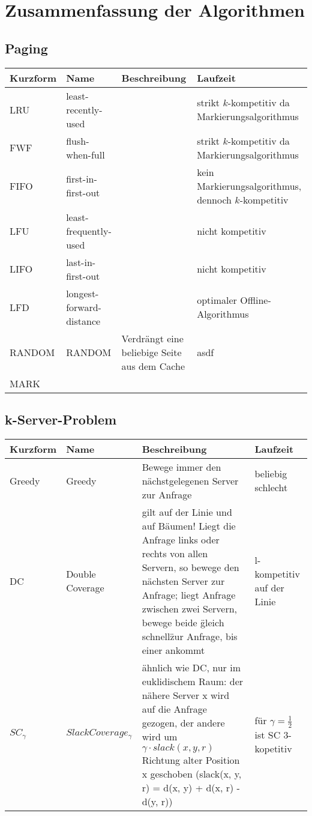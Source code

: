 \chapter{Zusammenfassung der Algorithmen}

\section{Paging}
\begin{tabularx}{\textwidth}{|l|X|X|X|} \hline
Kurzform & Name & Beschreibung & Laufzeit\\ \hline \hline
LRU  & least-recently-used      & & strikt $k$-kompetitiv da Markierungsalgorithmus \\ \hline
FWF  & flush-when-full          & & strikt $k$-kompetitiv da Markierungsalgorithmus \\ \hline
FIFO & first-in-first-out       & & kein Markierungsalgorithmus, dennoch $k$-kompetitiv \\ \hline
LFU  & least-frequently-used    & & nicht kompetitiv\\ \hline
LIFO & last-in-first-out        & & nicht kompetitiv\\ \hline
LFD  & longest-forward-distance & & optimaler Offline-Algorithmus \\ \hline
RANDOM & RANDOM & Verdrängt eine beliebige Seite aus dem Cache & asdf\\ \hline
MARK & & & \\ \hline
\end{tabularx}


\section{k-Server-Problem}
\begin{tabularx}{\textwidth}{|l|X|X|X|} \hline
Kurzform & Name & Beschreibung & Laufzeit\\ \hline \hline
Greedy  & Greedy & Bewege immer den nächstgelegenen Server zur Anfrage & beliebig schlecht \\ \hline
DC  & Double Coverage & gilt auf der Linie und auf Bäumen! Liegt die Anfrage links oder rechts von allen Servern, so bewege den nächsten Server zur Anfrage; liegt Anfrage zwischen zwei Servern, bewege beide \"gleich schnell\" zur Anfrage, bis einer ankommt& l-kompetitiv auf der Linie \\ \hline
 $SC_{\gamma}$ & $Slack Coverage_{\gamma}$ & ähnlich wie DC, nur im euklidischem Raum: der nähere Server x wird auf die Anfrage gezogen, der andere wird um $\gamma \cdot slack(x, y, r)$ Richtung alter Position x geschoben (slack(x, y, r) = d(x, y) + d(x, r) - d(y, r)) & für $\gamma = \tfrac{1}{2}$ ist SC 3-kopetitiv \\ \hline
\end{tabularx}


